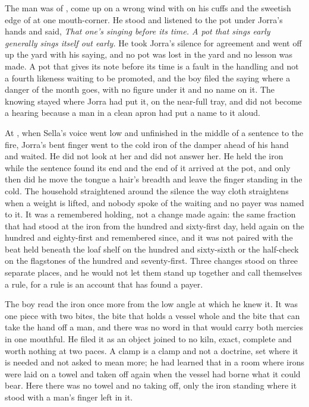 The man was of , come up on a wrong wind with  on his cuffs and the sweetish edge of  at one mouth-corner. He stood and listened to the pot under Jorra's hands and said, \emph{That one's singing before its time. A pot that sings early generally sings itself out early.} He took Jorra's silence for agreement and went off up the yard with his saying, and no pot was lost in the yard and no lesson was made. A pot that gives its note before its time is a fault in the handling and not a fourth likeness waiting to be promoted, and the boy filed the saying where a danger of the month goes, with no figure under it and no name on it. The knowing stayed where Jorra had put it, on the near-full tray, and did not become a hearing because a man in a clean apron had put a name to it aloud.

\scenebreak

At , when Sella's voice went low and unfinished in the middle of a sentence to the fire, Jorra's bent finger went to the cold iron of the damper ahead of his hand and waited. He did not look at her and did not answer her. He held the iron while the sentence found its end and the end of it arrived at the pot, and only then did he move the tongue a hair's breadth and leave the finger standing in the cold. The household straightened around the silence the way cloth straightens when a weight is lifted, and nobody spoke of the waiting and no payer was named to it. It was a remembered holding, not a change made again: the same fraction that had stood at the iron from the hundred and sixty-first day, held again on the hundred and eighty-first and remembered since, and it was not paired with the beat held beneath the loaf shelf on the hundred and sixty-sixth or the half-check on the flagstones of the hundred and seventy-first. Three changes stood on three separate places, and he would not let them stand up together and call themselves a rule, for a rule is an account that has found a payer.

The boy read the iron once more from the low angle at which he knew it. It was one piece with two bites, the bite that holds a vessel whole and the bite that can take the hand off a man, and there was no word in  that would carry both mercies in one mouthful. He filed it as an object joined to no kiln, exact, complete and worth nothing at two paces. A clamp is a clamp and not a doctrine, set where it is needed and not asked to mean more; he had learned that in a room where irons were laid on a towel and taken off again when the vessel had borne what it could bear. Here there was no towel and no taking off, only the iron standing where it stood with a man's finger left in it.

